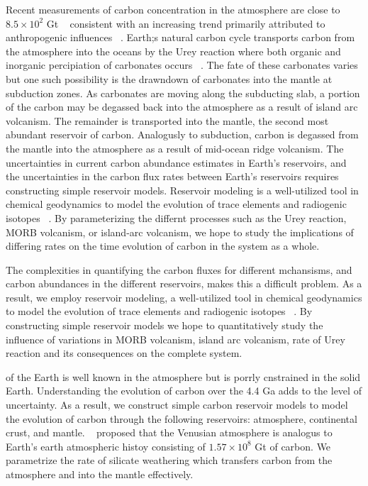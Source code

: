 Recent measurements of carbon concentration in the atmosphere are close to $8.5 \times 10^2$ Gt ~\cite{NOAA:2017} consistent with an increasing trend primarily attributed to anthropogenic influences ~\cite{DDJ:2015}. Earth;s natural carbon cycle transports carbon from the atmosphere into the oceans by the Urey reaction where both organic and inorganic percipiation of carbonates occurs ~\cite{UHC:1952}. The fate of these carbonates varies but one such possibility is the drawndown of carbonates into the mantle at subduction zones. As carbonates are moving along the subducting slab, a portion of the carbon may be degassed back into the atmosphere as a result of island arc volcanism. The remainder is transported into the mantle, the second most abundant reservoir of carbon. Analogusly to subduction, carbon is degassed from the mantle into the atmosphere as a result of mid-ocean ridge volcanism. The uncertainties in current carbon abundance estimates in Earth's reservoirs, and the uncertainties in the carbon flux rates between Earth's reservoirs requires constructing simple reservoir models. Reservoir modeling is a well-utilized tool in chemical geodynamics to model the evolution of trace elements and radiogenic isotopes ~\cite{ACJ-BO-DB:1980, KLH-WGJ:1990, SNH-ZK:2001}. By parameterizing the differnt processes such as the Urey reaction, MORB volcanism, or island-arc volcanism, we hope to study the implications of differing rates on the time evolution of carbon in the system as a whole. 


The complexities in quantifying the carbon fluxes for different mchansisms, and carbon abundances in the different reservoirs, makes this a difficult problem. As a result, we employ reservoir modeling, a well-utilized tool in chemical geodynamics to model the evolution of trace elements and radiogenic isotopes ~\cite{ACJ-BO-DB:1980, KLH-WGJ:1990, SNH-ZK:2001}. By constructing simple reservoir models we hope to quantitatively study the influence of variations in MORB volcanism, island arc volcanism, rate of Urey reaction and its consequences on the complete system.


of the Earth is well known in the atmosphere but is porrly cnstrained in the solid Earth. Understanding the evolution of carbon over the 4.4 Ga adds to the level of uncertainty. As a result, we construct simple carbon reservoir models to model the evolution of carbon through the following reservoirs: atmosphere, continental crust, and mantle. ~\citet{SNH-ZK:2001} proposed that the Venusian atmosphere is analogus to Earth's earth atmospheric histoy consisting of $1.57 \times 10^8$ Gt of carbon. We parametrize the rate of silicate weathering which transfers carbon from the atmosphere and into the mantle effectively. 


